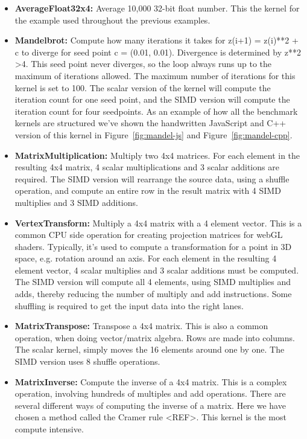 \documentclass[preprint]{sigplanconf}
\begin{document}
\begin{itemize}
\item
\textbf{AverageFloat32x4:} Average 10,000 32-bit float number.  This 
the kernel for the example used throughout the previous examples.

\item
\textbf{Mandelbrot:} Compute how many iterations it takes for
z(i+1) = z(i)**2 + c to diverge for seed point c = (0.01, 0.01).
Divergence is determined by z**2 \textgreater 4. This seed point never diverges, so
the loop always runs up to the maximum of iterations allowed.  The
maximum number of iterations for this kernel is set to 100.  The scalar version
of the kernel will compute the iteration count for one seed point, and
the SIMD version will compute the iteration count for four seedpoints.
As an example of how all the benchmark kernels are structured we've shown
the handwritten JavaScript and C++ version of this kernel in Figure~\ref{fig:mandel-js}
and Figure~\ref{fig:mandel-cpp}.

\item
\textbf{MatrixMultiplication:} Multiply two 4x4 matrices.  For each element in
the resulting 4x4 matrix, 4 scalar multiplications and 3 scalar additions are
required.  The SIMD version will rearrange the source data, using a shuffle operation,
and compute an entire row in the result matrix with 4 SIMD multiplies and 3 SIMD additions.

\item
\textbf{VertexTransform:} Multiply a 4x4 matrix with a 4 element vector.  This
is a common CPU side operation for creating projection matrices for webGL shaders.
Typically, it's used to compute a transformation for a point in 3D space, e.g. rotation
around an axis.  For each element in the resulting 4 element vector, 4 scalar multiplies
and 3 scalar additions must be computed.  The SIMD version will compute all 4 elements,
using SIMD multiplies and adds, thereby reducing the number of multiply and add instructions.
Some shuffling is required to get the input data into the right lanes.

\item
\textbf{MatrixTranspose:} Transpose a 4x4 matrix.  This is also a common operation, when
doing vector/matrix algebra.  Rows are made into columns.  The scalar kernel, simply moves
the 16 elements around one by one.  The SIMD version uses 8 shuffle operations.

\item
\textbf{MatrixInverse:} Compute the inverse of a 4x4 matrix.  This is a complex operation,
involving hundreds of multiples and add operations.  There are several different ways
of computing the inverse of a matrix.  Here we have chosen a method called the Cramer rule
<REF>.  This kernel is the most compute intensive.

\end{itemize}
\end{document}
